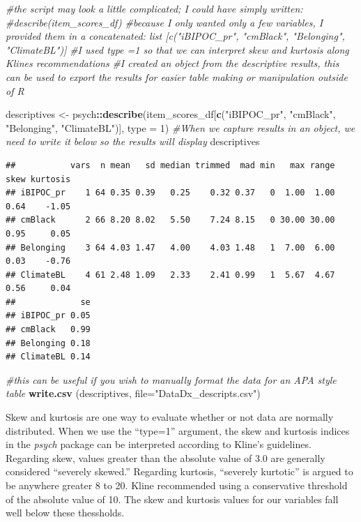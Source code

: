 \documentclass[
  11pt,
]{book}
\newenvironment{Shaded}{\begin{snugshade}}{\end{snugshade}}
\newcommand{\AttributeTok}[1]{\textcolor[rgb]{0.27,0.27,0.27}{#1}}
\newcommand{\CommentTok}[1]{\textcolor[rgb]{0.37,0.37,0.37}{\textit{#1}}}
\newcommand{\DecValTok}[1]{\textcolor[rgb]{0.06,0.06,0.06}{#1}}
\newcommand{\FunctionTok}[1]{\textcolor[rgb]{0.27,0.27,0.27}{\textbf{#1}}}
\newcommand{\NormalTok}[1]{#1}
\newcommand{\OtherTok}[1]{\textcolor[rgb]{0.37,0.37,0.37}{#1}}
\newcommand{\SpecialCharTok}[1]{\textcolor[rgb]{0.43,0.43,0.43}{\textbf{#1}}}
\newcommand{\StringTok}[1]{\textcolor[rgb]{0.5,0.5,0.5}{#1}}
\begin{document}
\begin{Shaded}
\begin{Highlighting}[]
\CommentTok{\#the script may look a little complicated; I could have simply written:}
\CommentTok{\#describe(item\_scores\_df) }
\CommentTok{\#because I only wanted only a few variables, I provided them in a concatenated: list [c("iBIPOC\_pr", "cmBlack", "Belonging", "ClimateBL")]}
\CommentTok{\#I used type =1 so that we can interpret skew and kurtosis along Kline\textquotesingle{}s recommendations}
\CommentTok{\#I created an object from the descriptive results, this can be used to export the results for easier table making or manipulation outside of R}

\NormalTok{descriptives }\OtherTok{\textless{}{-}}\NormalTok{ psych}\SpecialCharTok{::}\FunctionTok{describe}\NormalTok{(item\_scores\_df[}\FunctionTok{c}\NormalTok{(}\StringTok{"iBIPOC\_pr"}\NormalTok{, }\StringTok{"cmBlack"}\NormalTok{, }\StringTok{"Belonging"}\NormalTok{, }\StringTok{"ClimateBL"}\NormalTok{)], }\AttributeTok{type =} \DecValTok{1}\NormalTok{)}
\CommentTok{\#When we capture results in an object, we need to write it below so the results will display}
\NormalTok{descriptives}
\end{Highlighting}
\end{Shaded}

\begin{verbatim}
##           vars  n mean   sd median trimmed  mad min   max range skew kurtosis
## iBIPOC_pr    1 64 0.35 0.39   0.25    0.32 0.37   0  1.00  1.00 0.64    -1.05
## cmBlack      2 66 8.20 8.02   5.50    7.24 8.15   0 30.00 30.00 0.95     0.05
## Belonging    3 64 4.03 1.47   4.00    4.03 1.48   1  7.00  6.00 0.03    -0.76
## ClimateBL    4 61 2.48 1.09   2.33    2.41 0.99   1  5.67  4.67 0.56     0.04
##             se
## iBIPOC_pr 0.05
## cmBlack   0.99
## Belonging 0.18
## ClimateBL 0.14
\end{verbatim}

\begin{Shaded}
\begin{Highlighting}[]
\CommentTok{\#this can be useful if you wish to manually format the data for an APA style table}
\FunctionTok{write.csv}\NormalTok{ (descriptives, }\AttributeTok{file=}\StringTok{"DataDx\_descripts.csv"}\NormalTok{) }
\end{Highlighting}
\end{Shaded}

Skew and kurtosis are one way to evaluate whether or not data are normally distributed. When we use the ``type=1'' argument, the skew and kurtosis indices in the \emph{psych} package can be interpreted according to Kline's \citeyearpar{kline_data_2016} guidelines. Regarding skew, values greater than the absolute value of 3.0 are generally considered ``severely skewed.'' Regarding kurtosis, ``severely kurtotic'' is argued to be anywhere greater 8 to 20. Kline recommended using a conservative threshold of the absolute value of 10. The skew and kurtosis values for our variables fall well below these thessholds.
\end{document}

